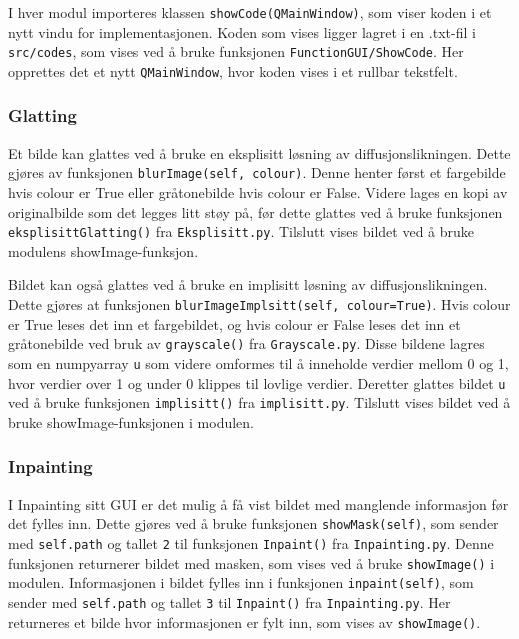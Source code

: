 I hver modul importeres klassen \texttt{showCode(QMainWindow)}, som viser koden i et nytt vindu for implementasjonen. Koden som vises ligger lagret i en .txt-fil i \texttt{src/codes}, som vises ved å bruke funksjonen \texttt{FunctionGUI/ShowCode}. Her opprettes det et nytt \texttt{QMainWindow}, hvor koden vises i et rullbar tekstfelt. 

\subsubsection{Glatting}
Et bilde kan glattes ved å bruke en eksplisitt løsning av diffusjonslikningen. Dette gjøres av funksjonen \texttt{blurImage(self, colour)}. Denne henter først et fargebilde hvis colour er True eller gråtonebilde hvis colour er False. Videre lages en kopi av originalbilde som det legges litt støy på, før dette glattes ved å bruke funksjonen \texttt{eksplisittGlatting()} fra \texttt{Eksplisitt.py}. Tilslutt vises bildet ved å bruke modulens showImage-funksjon.

Bildet kan også glattes ved å bruke en implisitt løsning av diffusjonslikningen. Dette gjøres at funksjonen \texttt{blurImageImplsitt(self, colour=True)}. Hvis colour er True leses det inn et fargebildet, og hvis colour er False leses det inn et gråtonebilde ved bruk av \texttt{grayscale()} fra \texttt{Grayscale.py}. Disse bildene lagres som en numpyarray \texttt{u} som videre omformes til å inneholde verdier mellom 0 og 1, hvor verdier over 1 og under 0 klippes til lovlige verdier. Deretter glattes bildet \texttt{u} ved å bruke funksjonen \texttt{implisitt()} fra \texttt{implisitt.py}. Tilslutt vises bildet ved å bruke showImage-funksjonen i modulen.

\subsubsection{Inpainting}
I Inpainting sitt GUI er det mulig å få vist bildet med manglende informasjon før det fylles inn. Dette gjøres ved å bruke funksjonen \texttt{showMask(self)}, som sender med \texttt{self.path} og tallet \texttt{2} til funksjonen \texttt{Inpaint()} fra \texttt{Inpainting.py}. Denne funksjonen returnerer bildet med masken, som vises ved å bruke \texttt{showImage()} i modulen. Informasjonen i bildet fylles inn i funksjonen \texttt{inpaint(self)}, som sender med \texttt{self.path} og tallet \texttt{3} til \texttt{Inpaint()} fra \texttt{Inpainting.py}. Her returneres et bilde hvor informasjonen er fylt inn, som vises av \texttt{showImage()}. 

